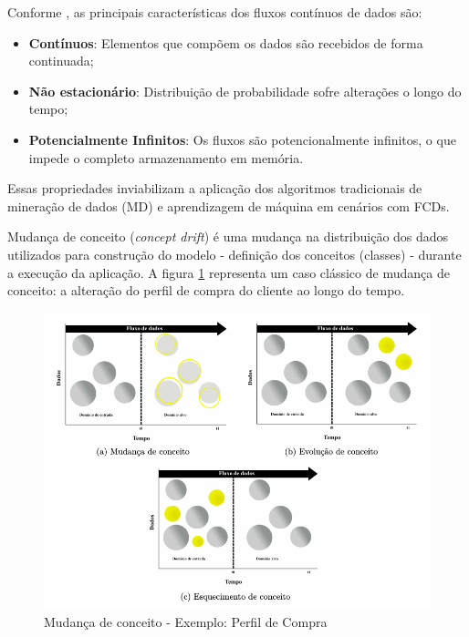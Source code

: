 \documentclass[qual, classic, a4paper]{ufbathesis}
\begin{document}
Conforme \cite{Gama:2014:survey}, as principais características dos fluxos contínuos de dados são:

\begin{itemize}
    \item \textbf{Contínuos}: Elementos que compõem os dados são recebidos de forma continuada;

    \item \textbf{Não estacionário}: Distribuição de probabilidade sofre alterações o longo do tempo;

    \item \textbf{Potencialmente Infinitos}: Os fluxos são potencionalmente infinitos, o que impede o completo armazenamento em memória.
\end{itemize}

Essas propriedades inviabilizam a aplicação dos algoritmos tradicionais de mineração de dados (MD) e aprendizagem de máquina em cenários com FCDs.

Mudança de conceito (\textit{concept drift}) é uma mudança na distribuição dos dados utilizados para construção do modelo - definição dos conceitos (classes) - durante a execução da aplicação. A figura \ref{fig1} representa um caso clássico de mudança de conceito: a alteração do perfil de compra do cliente ao longo do tempo.

\begin{figure}[htbp]
    \begin{center}
      \includegraphics[scale=0.4]{001.png}
    \caption{Mudança de conceito - Exemplo: Perfil de Compra}
    \label{fig1}
    \end{center}
\end{figure}
\end{document}
